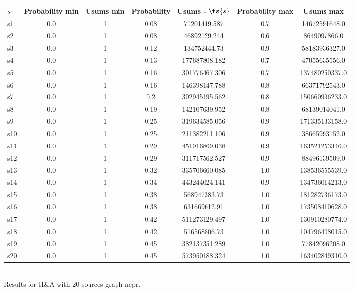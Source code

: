 \documentclass{article}
\begin{document}
\noindent\begin{tabular}{|l|c|c|c|c|c|c|}
\hline
$s$& Probability min & Usums min & Probability & Usums - $\ts{s}$ & Probability max & Usums max\\
\hline
s1 &0.0 & 1 & 0.08 & 71201449.587 & 0.7 & 14672591648.0\\
\hline
s2 &0.0 & 1 & 0.08 & 46892129.244 & 0.6 & 8649097866.0\\
\hline
s3 &0.0 & 1 & 0.12 & 134752444.73 & 0.9 & 58183936327.0\\
\hline
s4 &0.0 & 1 & 0.13 & 177687808.182 & 0.7 & 47055635556.0\\
\hline
s5 &0.0 & 1 & 0.16 & 301776467.306 & 0.7 & 137480250337.0\\
\hline
s6 &0.0 & 1 & 0.16 & 146398147.788 & 0.8 & 66371792543.0\\
\hline
s7 &0.0 & 1 & 0.2 & 302945195.562 & 0.8 & 150660996233.0\\
\hline
s8 &0.0 & 1 & 0.19 & 142107639.952 & 0.8 & 68139014041.0\\
\hline
s9 &0.0 & 1 & 0.25 & 319634585.056 & 0.9 & 171335133158.0\\
\hline
s10 &0.0 & 1 & 0.25 & 211382211.106 & 0.9 & 38665993152.0\\
\hline
s11 &0.0 & 1 & 0.29 & 451916869.038 & 0.9 & 163521253346.0\\
\hline
s12 &0.0 & 1 & 0.29 & 311717562.527 & 0.9 & 88496139509.0\\
\hline
s13 &0.0 & 1 & 0.32 & 335706660.085 & 1.0 & 138536555539.0\\
\hline
s14 &0.0 & 1 & 0.34 & 443244024.141 & 0.9 & 134736014213.0\\
\hline
s15 &0.0 & 1 & 0.38 & 568947383.73 & 1.0 & 181282736173.0\\
\hline
s16 &0.0 & 1 & 0.38 & 631669612.91 & 1.0 & 173508410628.0\\
\hline
s17 &0.0 & 1 & 0.42 & 511273129.497 & 1.0 & 130910280774.0\\
\hline
s18 &0.0 & 1 & 0.42 & 516568806.73 & 1.0 & 104796408015.0\\
\hline
s19 &0.0 & 1 & 0.45 & 382137351.289 & 1.0 & 77842096208.0\\
\hline
s20 &0.0 & 1 & 0.45 & 573950188.324 & 1.0 & 163402849310.0\\
\hline
\end{tabular}\\

\noindent Results for H\&A with 20 sources graph ncpr.
\end{document}
